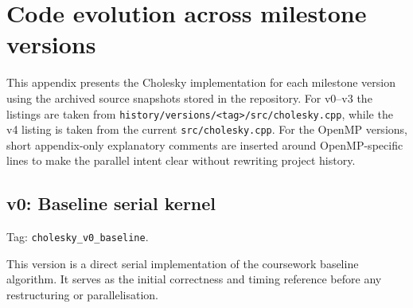 \section{Code evolution across milestone versions}

%


This appendix presents the Cholesky implementation for each milestone version using the archived source snapshots stored in the repository. For v0--v3 the listings are taken from \texttt{history/versions/<tag>/src/cholesky.cpp}, while the v4 listing is taken from the current \texttt{src/cholesky.cpp}. For the OpenMP versions, short appendix-only explanatory comments are inserted around OpenMP-specific lines to make the parallel intent clear without rewriting project history.

\subsection{v0: Baseline serial kernel}

Tag: \texttt{cholesky\_v0\_baseline}.

This version is a direct serial implementation of the coursework baseline algorithm. It serves as the initial correctness and timing reference before any restructuring or parallelisation.

